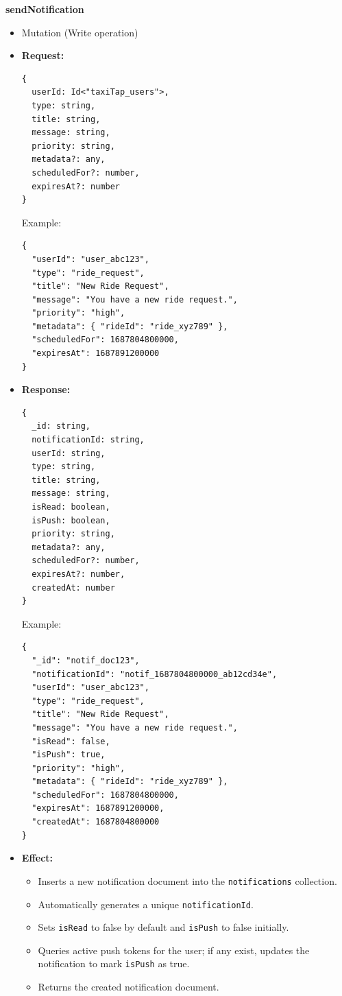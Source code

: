 \documentclass[a4paper,12pt]{article}
\begin{document}
\item \textbf{sendNotification}
  \begin{itemize}
    \item Mutation (Write operation)
    \item \textbf{Request:}
    \begin{verbatim}
{
  userId: Id<"taxiTap_users">,
  type: string,
  title: string,
  message: string,
  priority: string,
  metadata?: any,
  scheduledFor?: number,
  expiresAt?: number
}
    \end{verbatim}
    Example:
    \begin{verbatim}
{
  "userId": "user_abc123",
  "type": "ride_request",
  "title": "New Ride Request",
  "message": "You have a new ride request.",
  "priority": "high",
  "metadata": { "rideId": "ride_xyz789" },
  "scheduledFor": 1687804800000,
  "expiresAt": 1687891200000
}
    \end{verbatim}
    \item \textbf{Response:}
    \begin{verbatim}
{
  _id: string,
  notificationId: string,
  userId: string,
  type: string,
  title: string,
  message: string,
  isRead: boolean,
  isPush: boolean,
  priority: string,
  metadata?: any,
  scheduledFor?: number,
  expiresAt?: number,
  createdAt: number
}
    \end{verbatim}
    Example:
    \begin{verbatim}
{
  "_id": "notif_doc123",
  "notificationId": "notif_1687804800000_ab12cd34e",
  "userId": "user_abc123",
  "type": "ride_request",
  "title": "New Ride Request",
  "message": "You have a new ride request.",
  "isRead": false,
  "isPush": true,
  "priority": "high",
  "metadata": { "rideId": "ride_xyz789" },
  "scheduledFor": 1687804800000,
  "expiresAt": 1687891200000,
  "createdAt": 1687804800000
}
    \end{verbatim}
    \item \textbf{Effect:}
    \begin{itemize}
      \item Inserts a new notification document into the \texttt{notifications} collection.
      \item Automatically generates a unique \texttt{notificationId}.
      \item Sets \texttt{isRead} to false by default and \texttt{isPush} to false initially.
      \item Queries active push tokens for the user; if any exist, updates the notification to mark \texttt{isPush} as true.
      \item Returns the created notification document.
    \end{itemize}
  \end{itemize}
\end{document}
